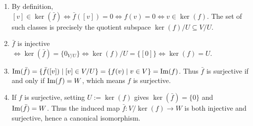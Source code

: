 \begin{exercisesolution}
\label{sol:properties_induced_quotient_maps}
\begin{enumerate}[label=\textbf{(\alph*)}]
    \item By definition, $[v] \in \ker(\bar{f}) \iff \bar{f}([v]) = 0 \iff f(v) = 0 \iff v \in \ker(f)$.
    The set of such classes is precisely the quotient subspace $\ker(f)/U \subseteq V/U$.

    \item $\bar{f}$ is injective $\iff \ker(\bar{f}) = \{0_{V/U}\} \iff \ker(f)/U = \{[0]\} \iff \ker(f) = U$.

    \item $\operatorname{Im}(\bar{f}) = \{\bar{f}([v]) \mid [v] \in V/U\} = \{f(v) \mid v \in V\} = \operatorname{Im}(f)$.
    Thus $\bar{f}$ is surjective if and only if $\operatorname{Im}(f) = W$, which means $f$ is surjective.

    \item If $f$ is surjective, setting $U := \ker(f)$ gives $\ker(\bar{f}) = \{0\}$ and $\operatorname{Im}(\bar{f}) = W$.
    Thus the induced map $\bar{f} \colon V/\ker(f) \to W$ is both injective and surjective, hence a canonical isomorphism. \qedhere
\end{enumerate}
\end{exercisesolution}

